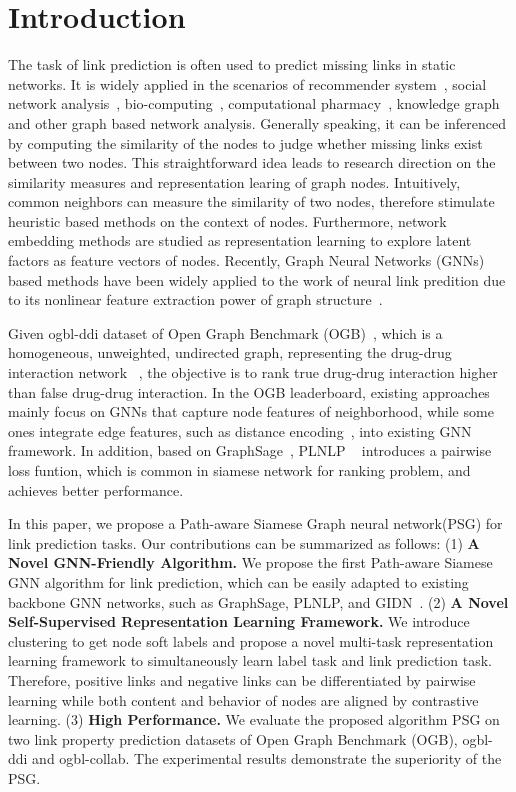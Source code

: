 \documentclass[sigconf]{acmart}
\begin{document}
\section{Introduction}
The task of link prediction is often used to predict missing links in static networks.  It is widely applied in the scenarios of recommender system~\cite{bennett2007netflix}, social network analysis~\cite{adamic2003friends}, bio-computing~\cite{zhao2018bipartite}, computational pharmacy~\cite{stanfield2017drug}, knowledge graph~\cite{nickel2015review} and
 other graph based network analysis. Generally speaking, it can be inferenced by computing the similarity of the  nodes to judge whether missing links exist between two nodes. This straightforward idea leads to research direction on the similarity measures and representation learing of graph nodes. Intuitively, common neighbors can measure the similarity of two nodes, therefore stimulate heuristic based methods on the context of nodes. Furthermore, network embedding methods are studied  as representation learning to explore latent factors as feature vectors of nodes. Recently, Graph Neural Networks (GNNs) based methods have been widely applied to the work of neural link predition due to its nonlinear feature extraction power of graph structure~\cite{wu2020comprehensive,zhou2020graph}.

\par Given ogbl-ddi dataset of Open Graph Benchmark (OGB)~\cite{hu2020ogb}, which is a homogeneous, unweighted, undirected graph, representing the drug-drug interaction network ~\cite{wishart2018drugbank}, the objective is to rank true drug-drug interaction higher than false drug-drug interaction. In the OGB leaderboard, existing approaches  mainly focus on GNNs that capture node features of neighborhood, while some ones integrate edge features, such as distance encoding~\cite{li2020distance}, into existing GNN framework. In addition, based on GraphSage~\cite{hamilton2017inductive}, PLNLP ~\cite{wang2021pairwise} introduces a pairwise loss funtion, which is common in siamese network for ranking problem, and achieves better performance.  

In this paper, we propose a Path-aware Siamese Graph neural network(PSG) for link prediction tasks. Our contributions can be summarized as follows: (1) \textbf{A Novel GNN-Friendly Algorithm.} We propose the first Path-aware Siamese GNN algorithm for link prediction, which can be easily adapted to existing backbone GNN networks, such as GraphSage, PLNLP, and GIDN~\cite{wang2022gidn}. (2) \textbf{A Novel Self-Supervised Representation Learning Framework.} We introduce clustering to get node soft labels and propose a novel multi-task representation learning framework to simultaneously learn label task and link prediction task. Therefore, positive links and negative links can be differentiated by pairwise learning while both content and behavior of nodes are aligned by contrastive learning. (3) \textbf{High Performance.} We evaluate the proposed algorithm PSG  on two link property prediction datasets of Open Graph Benchmark (OGB), ogbl-ddi and ogbl-collab. The experimental results demonstrate the superiority of the PSG.
\end{document}
